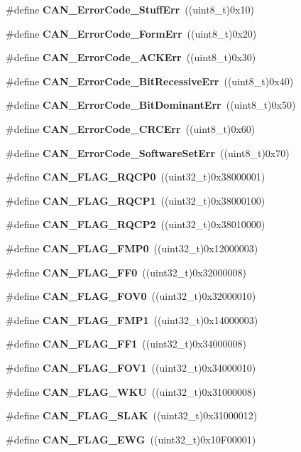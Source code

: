 \begin{DoxyCompactItemize}
\item 
\#define \textbf{ C\+A\+N\+\_\+\+Error\+Code\+\_\+\+Stuff\+Err}~((uint8\+\_\+t)0x10)
\item 
\#define \textbf{ C\+A\+N\+\_\+\+Error\+Code\+\_\+\+Form\+Err}~((uint8\+\_\+t)0x20)
\item 
\#define \textbf{ C\+A\+N\+\_\+\+Error\+Code\+\_\+\+A\+C\+K\+Err}~((uint8\+\_\+t)0x30)
\item 
\#define \textbf{ C\+A\+N\+\_\+\+Error\+Code\+\_\+\+Bit\+Recessive\+Err}~((uint8\+\_\+t)0x40)
\item 
\#define \textbf{ C\+A\+N\+\_\+\+Error\+Code\+\_\+\+Bit\+Dominant\+Err}~((uint8\+\_\+t)0x50)
\item 
\#define \textbf{ C\+A\+N\+\_\+\+Error\+Code\+\_\+\+C\+R\+C\+Err}~((uint8\+\_\+t)0x60)
\item 
\#define \textbf{ C\+A\+N\+\_\+\+Error\+Code\+\_\+\+Software\+Set\+Err}~((uint8\+\_\+t)0x70)
\item 
\#define \textbf{ C\+A\+N\+\_\+\+F\+L\+A\+G\+\_\+\+R\+Q\+C\+P0}~((uint32\+\_\+t)0x38000001)
\item 
\#define \textbf{ C\+A\+N\+\_\+\+F\+L\+A\+G\+\_\+\+R\+Q\+C\+P1}~((uint32\+\_\+t)0x38000100)
\item 
\#define \textbf{ C\+A\+N\+\_\+\+F\+L\+A\+G\+\_\+\+R\+Q\+C\+P2}~((uint32\+\_\+t)0x38010000)
\item 
\#define \textbf{ C\+A\+N\+\_\+\+F\+L\+A\+G\+\_\+\+F\+M\+P0}~((uint32\+\_\+t)0x12000003)
\item 
\#define \textbf{ C\+A\+N\+\_\+\+F\+L\+A\+G\+\_\+\+F\+F0}~((uint32\+\_\+t)0x32000008)
\item 
\#define \textbf{ C\+A\+N\+\_\+\+F\+L\+A\+G\+\_\+\+F\+O\+V0}~((uint32\+\_\+t)0x32000010)
\item 
\#define \textbf{ C\+A\+N\+\_\+\+F\+L\+A\+G\+\_\+\+F\+M\+P1}~((uint32\+\_\+t)0x14000003)
\item 
\#define \textbf{ C\+A\+N\+\_\+\+F\+L\+A\+G\+\_\+\+F\+F1}~((uint32\+\_\+t)0x34000008)
\item 
\#define \textbf{ C\+A\+N\+\_\+\+F\+L\+A\+G\+\_\+\+F\+O\+V1}~((uint32\+\_\+t)0x34000010)
\item 
\#define \textbf{ C\+A\+N\+\_\+\+F\+L\+A\+G\+\_\+\+W\+KU}~((uint32\+\_\+t)0x31000008)
\item 
\#define \textbf{ C\+A\+N\+\_\+\+F\+L\+A\+G\+\_\+\+S\+L\+AK}~((uint32\+\_\+t)0x31000012)
\item 
\#define \textbf{ C\+A\+N\+\_\+\+F\+L\+A\+G\+\_\+\+E\+WG}~((uint32\+\_\+t)0x10\+F00001)
\item 

\end{DoxyCompactItemize}
